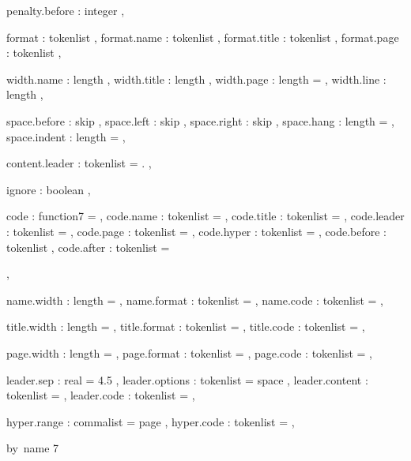   {
    penalty.before : integer ,

    format         : tokenlist ,
    format.name    : tokenlist ,
    format.title   : tokenlist ,
    format.page    : tokenlist ,

    width.name     : length ,
    width.title    : length ,
    width.page     : length = \@pnumwidth ,
    width.line     : length ,

    space.before   : skip ,
    space.left     : skip ,
    space.right    : skip ,
    space.hang     : length =  ,
    space.indent   : length =  ,

    content.leader : tokenlist = { . } ,

    ignore         : boolean ,

    code           : function{7} =  ,
    code.name      : tokenlist   = \tmcbl@name@ ,
    code.title     : tokenlist   = \tmcbl@title@ ,
    code.leader    : tokenlist   = \tmcbl@leader@ ,
    code.page      : tokenlist   = \tmcbl@page@ ,
    code.hyper     : tokenlist   =  ,
    code.before    : tokenlist ,
    code.after     : tokenlist   = \par ,

    name.width     : length      =  ,
    name.format    : tokenlist   =  ,
    name.code      : tokenlist   =  ,

    title.width    : length      =  ,
    title.format   : tokenlist   =  ,
    title.code     : tokenlist   =  ,

    page.width     : length      =  ,
    page.format    : tokenlist   =  ,
    page.code      : tokenlist   =  ,

    leader.sep     : real = 4.5 ,
    leader.options : tokenlist   = space ,
    leader.content : tokenlist   =  ,
    leader.code    : tokenlist   =  ,

    hyper.range    : commalist   = page ,
    hyper.code     : tokenlist   =  ,
  }
 { by~name } { 7 }
